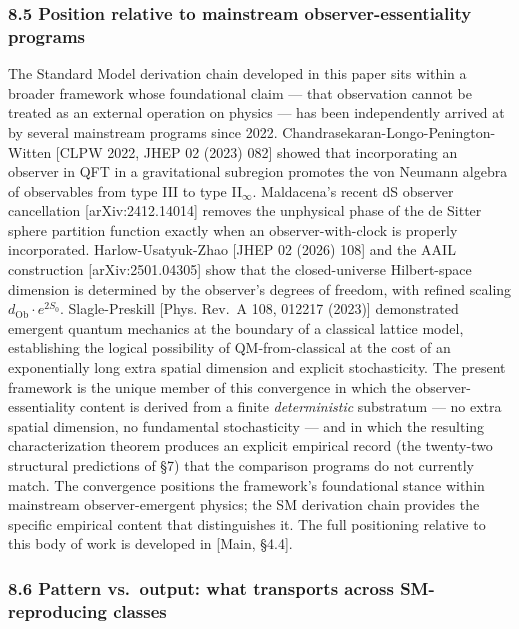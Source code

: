 \documentclass[
]{article}
\begin{document}
\hypertarget{position-relative-to-mainstream-observer-essentiality-programs}{%
\subsubsection{8.5 Position relative to mainstream observer-essentiality
programs}\label{position-relative-to-mainstream-observer-essentiality-programs}}

The Standard Model derivation chain developed in this paper sits within
a broader framework whose foundational claim --- that observation cannot
be treated as an external operation on physics --- has been
independently arrived at by several mainstream programs since 2022.
Chandrasekaran-Longo-Penington-Witten {[}CLPW 2022, JHEP 02 (2023)
082{]} showed that incorporating an observer in QFT in a gravitational
subregion promotes the von Neumann algebra of observables from type III
to type II\(_\infty\). Maldacena's recent dS observer cancellation
{[}arXiv:2412.14014{]} removes the unphysical phase of the de Sitter
sphere partition function exactly when an observer-with-clock is
properly incorporated. Harlow-Usatyuk-Zhao {[}JHEP 02 (2026) 108{]} and
the AAIL construction {[}arXiv:2501.04305{]} show that the
closed-universe Hilbert-space dimension is determined by the observer's
degrees of freedom, with refined scaling
\(d_{\text{Ob}} \cdot e^{2S_0}\). Slagle-Preskill {[}Phys. Rev.~A 108,
012217 (2023){]} demonstrated emergent quantum mechanics at the boundary
of a classical lattice model, establishing the logical possibility of
QM-from-classical at the cost of an exponentially long extra spatial
dimension and explicit stochasticity. The present framework is the
unique member of this convergence in which the observer-essentiality
content is derived from a finite \emph{deterministic} substratum --- no
extra spatial dimension, no fundamental stochasticity --- and in which
the resulting characterization theorem produces an explicit empirical
record (the twenty-two structural predictions of §7) that the comparison
programs do not currently match. The convergence positions the
framework's foundational stance within mainstream observer-emergent
physics; the SM derivation chain provides the specific empirical content
that distinguishes it. The full positioning relative to this body of
work is developed in {[}Main, §4.4{]}.

\hypertarget{pattern-vs.-output-what-transports-across-sm-reproducing-classes}{%
\subsubsection{8.6 Pattern vs.~output: what transports across
SM-reproducing
classes}\label{pattern-vs.-output-what-transports-across-sm-reproducing-classes}}
\end{document}
